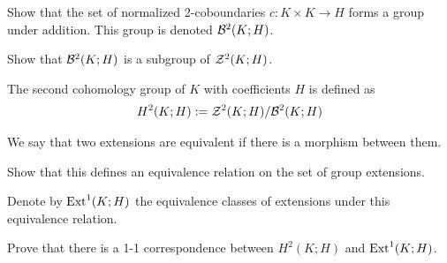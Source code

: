 \begin{qbox}
  Show that the set of normalized 2-coboundaries $c: K \times K \rightarrow H$ forms a group under addition.
  This group is denoted $\mathcal{B}^2(K; H)$.
\end{qbox}

\begin{qbox}
  Show that $\mathcal{B}^2(K; H)$ is a subgroup of $\mathcal{Z}^2(K;H)$.
\end{qbox}

\begin{definition}
  The second cohomology group of $K$ with coefficients $H$ is defined as
  \begin{align*}
    H^2(K;H) := \mathcal{Z}^2(K;H) / \mathcal{B}^2(K; H)
  \end{align*}
\end{definition}

We say that two extensions are equivalent if there is a morphism between them.
\begin{qbox}
  Show that this defines an equivalence relation on the set of group extensions.
\end{qbox}

Denote by $\operatorname{Ext}^1(K;H)$ the equivalence classes of extensions under this equivalence relation.

\begin{qbox}
  Prove that there is a 1-1 correspondence between $H^2(K;H)$ and $\operatorname{Ext}^1(K;H)$.
\end{qbox}
